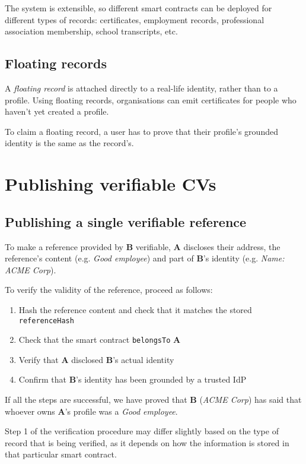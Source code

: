 \documentclass[a4paper, bibliography=totoc, titlepage=false]{scrartcl}
\begin{document}
The system is extensible, so different smart contracts can be deployed for different types of records: certificates, employment records, professional association membership, school transcripts, etc.

\subsection{Floating records}

A \emph{floating record} is attached directly to a real-life identity, rather than to a profile. Using floating records, organisations can emit certificates for people who haven't yet created a profile.

To claim a floating record, a user has to prove that their profile's grounded identity is the same as the record's.

\section{Publishing verifiable CVs}

\subsection{Publishing a single verifiable reference}

To make a reference provided by \textbf{B} verifiable, \textbf{A} discloses their address, the reference's content (e.g. \emph{Good employee}) and part of \textbf{B}'s identity (e.g. \emph{Name: ACME Corp}).

\vspace{2.5mm}
To verify the validity of the reference, proceed as follows:

\begin{enumerate}
	\item Hash the reference content and check that it matches the stored \texttt{referenceHash}
	\item Check that the smart contract \texttt{belongsTo} \textbf{A}
	\item Verify that \textbf{A} disclosed \textbf{B}'s actual identity
	\item Confirm that \textbf{B}'s identity has been grounded by a trusted IdP
\end{enumerate}

If all the steps are successful, we have proved that \textbf{B} (\emph{ACME Corp}) has said that whoever owns \textbf{A}'s profile was a \emph{Good employee}.

Step 1 of the verification procedure may differ slightly based on the type of record that is being verified, as it depends on how the information is stored in that particular smart contract.
\end{document}

